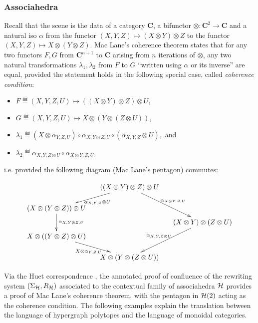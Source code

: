 \subsubsection{Associahedra} \label{Huet-correspondence}
Recall that the scene is the data of a category $\mathbf C$, a bifunctor $\otimes:\mathbf{C}^2\rightarrow \mathbf C$ and a natural iso $\alpha$ from the functor
$(X,Y,Z)\mapsto (X\otimes Y)\otimes Z$ to the functor  $(X,Y,Z)\mapsto X \otimes (Y\otimes Z)$. 
Mac Lane's coherence theorem states that for any two functors $F,G$ from $\mathbf{C}^{n+1}$ to $\mathbf{C}$ arising from $n$ iterations of $\otimes$, any two  natural transformations $\lambda_1,\lambda_2$ from $F$ to $G$  ``written using $\alpha$ or its inverse'' are equal, provided the statement holds in the following special case, called  {\em coherence condition}: 
\begin{itemize}
\item $F\eqdef (X,Y,Z,U)\mapsto ((X\otimes Y)\otimes Z)\otimes U,$ 
\item $G\eqdef (X,Y,Z,U)\mapsto X\otimes (Y\otimes (Z\otimes U)),$ 
\item $\lambda_1\eqdef (X\otimes\alpha_{Y,Z,U})\circ\alpha_{X,Y\otimes Z,U} \circ (\alpha_{X,Y,Z}\otimes U),$ and
\item $\lambda_2\eqdef  \alpha_{X,Y,Z\otimes U}\circ \alpha_{X\otimes Y,Z,U},$ 
\end{itemize}
i.e. provided the following diagram (Mac Lane's pentagon) commutes:
\begin{center}
\vspace{-.5cm}
$$
 \xymatrix @-1.65pc {&& ((X\otimes Y)\otimes Z)\otimes U \ar @{->}[ddll]^{\alpha_{X,Y,Z}\otimes U} \ar @{->}[dddrr]^{\alpha_{X\otimes Y,Z,U}}&& \\
 &&&&\\
 (X\otimes (Y\otimes Z))\otimes U  \ar @{->}[dd]^{\alpha_{X,Y\otimes Z,U} }&&   && \\
 &&&&(X\otimes Y)\otimes (Z\otimes U) \ar @{->}[dddll]_{\alpha_{X,Y,Z\otimes U}}\\
 X\otimes ((Y\otimes Z)\otimes U) \ar @{->}[ddrr]_{X\otimes\alpha_{Y,Z,U}} &  &\\
 &&&&\\
 &&X\otimes (Y\otimes (Z\otimes U))&&}
$$
\end{center}

Via the Huet correspondence \cite{Huet-notes-cat}, the annotated proof of confluence of the rewriting system $(\Sigma_{\mathcal{H}}, R_{\mathcal{H}})$ associated to the contextual family of associahedra $\mathcal{H}$ provides a proof of Mac Lane's coherence theorem, with the pentagon in $\mathcal{H}(2)$ acting as the coherence condition. 
The following examples explain the translation between the language of hypergraph polytopes and the language of monoidal categories. 

